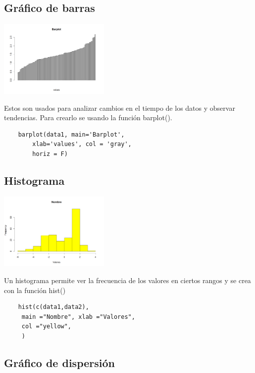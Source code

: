 \documentclass[twoside,twocolumn]{article}
\begin{document}
\subsection{Gráfico de barras}

\begin{center}
    \includegraphics[width=0.4\textwidth]{images/barplot.png}
\end{center}

Estos son usados para analizar cambios en el tiempo de los datos y observar tendencias. Para crearlo se usando la función barplot().

\begin{verbatim}
    barplot(data1, main='Barplot', 
        xlab='values', col = 'gray', 
        horiz = F)
\end{verbatim}

\subsection{Histograma}

\begin{center}
    \includegraphics[width=0.4\textwidth]{images/hist.png}
\end{center}

Un histograma permite ver la frecuencia de los valores en ciertos rangos y se crea con la función hist()

\begin{verbatim}
    hist(c(data1,data2), 
     main ="Nombre", xlab ="Valores",
     col ="yellow",
     )
\end{verbatim}

\subsection{Gráfico de dispersión}
\end{document}
